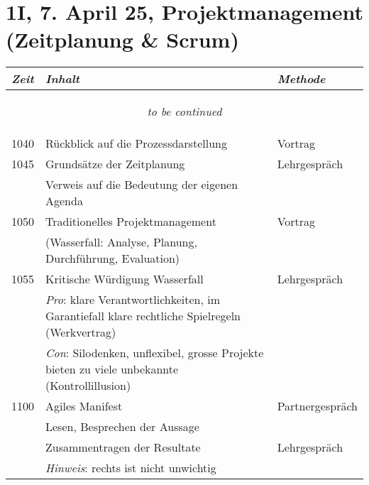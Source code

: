 \documentclass[a4paper]{scrreprt}
\begin{document}
\section*{1I, 7. April 25, Projektmanagement (Zeitplanung \& Scrum)}
\begin{longtable}{p{1.5cm}>{\RaggedRight}p{7.5cm}p{2.5cm}}
    \toprule
    \emph{Zeit}&\emph{Inhalt}&\emph{Methode}\\
    \midrule
    \endhead

    \midrule
    \multicolumn{3}{c}{\begin{tiny}\textit{to be continued}\end{tiny}}\\
    \midrule
    \endfoot

    \bottomrule
    \endlastfoot

    1040&Rückblick auf die Prozessdarstellung&Vortrag\\ [5pt]

    1045&Grundsätze der Zeitplanung&Lehrgespräch\\
        &Verweis auf die Bedeutung der eigenen Agenda&\\ [5pt]

    1050&Traditionelles Projektmanagement&Vortrag\\
        &(Wasserfall: Analyse, Planung, Durchführung, Evaluation)&\\
        [5pt]

    1055&Kritische Würdigung Wasserfall&Lehrgespräch\\
        &\textit{Pro}: klare Verantwortlichkeiten, im Garantiefall klare
        rechtliche Spielregeln (Werkvertrag)&\\
        &\textit{Con}: Silodenken, unflexibel, grosse Projekte bieten zu
        viele unbekannte (Kontrollillusion)&\\

    1100&Agiles Manifest&Partnergespräch\\
        &Lesen, Besprechen der Aussage&\\
        &Zusammentragen der Resultate&Lehrgespräch\\
        &\textit{Hinweis}: rechts ist nicht unwichtig&\\ [5pt]


\end{longtable}
\end{document}
